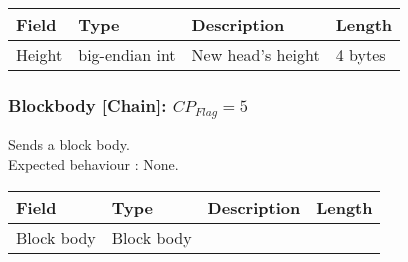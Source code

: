 \documentclass[a4paper,10pt]{article}
\begin{document}
                \noindent\begin{tabularx}{\textwidth}{|l|l|X|l|}
                    \hline Field & Type & Description & Length \\ \hline
                    \hline Height & big-endian int & New head's height & 4 bytes \\
                    \hline
                \end{tabularx}
            
            \subsubsection{Blockbody [Chain]: $CP_{Flag} = 5$}
                Sends a block body.\\
                Expected behaviour : None.\\
                
                \noindent\begin{tabularx}{\textwidth}{|l|l|X|l|}
                    \hline Field & Type & Description & Length \\ \hline
                    \hline Block body & Block body& & \\
                    \hline
                \end{tabularx}
\end{document}
